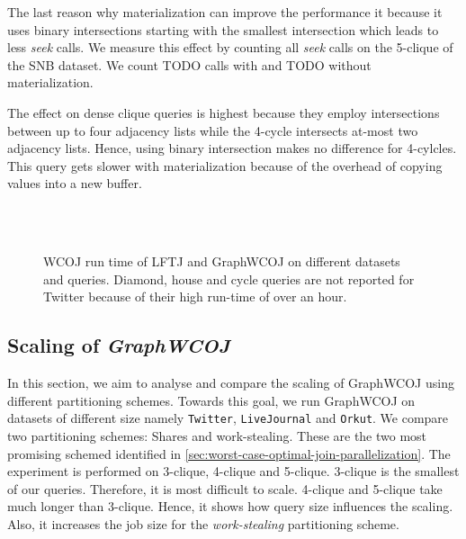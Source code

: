 The last reason why materialization can improve the performance it because it uses binary
intersections starting with the smallest intersection which leads to less \textit{seek} calls.
We measure this effect by counting all \textit{seek} calls on the 5-clique of the SNB dataset.
We count TODO calls with and TODO without materialization.

The effect on dense clique queries is highest because they employ intersections between up to
four adjacency lists while the 4-cycle intersects at-most two adjacency lists.
Hence, using binary intersection makes no difference for 4-cylcles.
This query gets slower with materialization because of the overhead of copying values into a new buffer.

\begin{figure}
    \subfloat[Amazon-0302]{}
    \subfloat[Amazon-0601]{
    
    
    }\\
    \subfloat[SNB-1]{
    
    
    }\\
    \subfloat[Twitter]{
    
    }
    \caption{
    WCOJ run time of \textsc{LFTJ} and GraphWCOJ on different datasets and queries.
    Diamond, house and cycle queries are not reported for Twitter because of their high
    run-time of over an hour.
    }
    \label{fig:lftj-graphWCOJ}
\end{figure}

\subsection{Scaling of \textit{Graph\textsc{WCOJ}}} \label{subsec:scaling-graphWCOJ}

In this section, we aim to analyse and compare the scaling of Graph\textsc{WCOJ} using different
partitioning schemes.
Towards this goal, we run Graph\textsc{WCOJ} on datasets of different size namely \texttt{Twitter},
\texttt{LiveJournal} and \texttt{Orkut}.
We compare two partitioning schemes: Shares and work-stealing.
These are the two most promising schemed identified in \cref{sec:worst-case-optimal-join-parallelization}.
The experiment is performed on 3-clique, 4-clique and 5-clique.
3-clique is the smallest of our queries.
Therefore, it is most difficult to scale.
4-clique and 5-clique take much longer than 3-clique.
Hence, it shows how query size influences the scaling.
Also, it increases the job size for the \textit{work-stealing} partitioning scheme.

